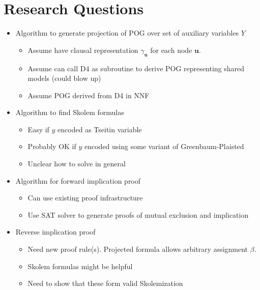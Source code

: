 \documentclass[letterpaper,USenglish,cleveref, autoref, thm-restate]{lipics-v2021}
\newcommand{\avarset}{Y}
\newcommand{\aassign}{\beta}
\newcommand{\makenode}[1]{\mathbf{#1}}
\newcommand{\nodeu}{\makenode{u}}
\newcommand{\progname}[1]{\textsc{#1}}
\newcommand{\dfour}{\progname{D4}}
\begin{document}
\section{Research Questions}

\begin{itemize}
\item Algorithm to generate projection of POG over set of auxiliary variables $\avarset$
  \begin{itemize}
  \item Assume have clausal representation $\gamma_{\nodeu}$ for each node $\nodeu$.
  \item Assume can call \dfour{} as subroutine to derive POG representing shared models (could blow up)
  \item Assume POG derived from \dfour{} in NNF
  \end{itemize}
\item Algorithm to find Skolem formulas
  \begin{itemize}
  \item Easy if $y$ encoded as Tseitin variable
  \item Probably OK if $y$ encoded using some variant of Greenbaum-Plaisted
  \item Unclear how to solve in general
  \end{itemize}
\item Algorithm for forward implication proof
  \begin{itemize}
  \item Can use existing proof infrastructure
  \item Use SAT solver to generate proofs of mutual exclusion and implication
  \end{itemize}
\item Reverse implication proof
  \begin{itemize}
  \item Need new proof rule(s).  Projected formula allows arbitrary assignment $\aassign$.
  \item Skolem formulas might be helpful
  \item Need to show that these form valid Skolemization
  \end{itemize}
\end{itemize}
\end{document}
